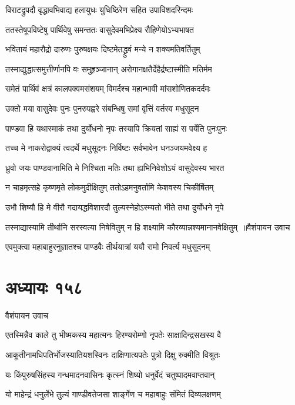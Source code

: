 \twolineshloka
{विराटद्रुपदौ वृद्धावभिवाद्य हलायुधः}
{युधिष्ठिरेण सहित उपाविशदरिन्दमः}


\twolineshloka
{ततस्तेषूपविष्टेषु पार्थिवेषु समन्ततः}
{वासुदेवमभिप्रेक्ष्य रौहिणेयोऽभ्यभाषत}


\twolineshloka
{भवितायं महारौद्रो दारुणः पुरुषक्षयः}
{दिष्टमेतद्ध्रुवं मन्ये न शक्यमतिवर्तितुम्}


\twolineshloka
{तस्माद्युद्धात्समुत्तीर्णानपि वः समुहृञ्जानान्}
{अरोगानक्षतैर्देहैर्द्रष्टास्मीति मतिर्मम}


\twolineshloka
{समेतं पार्थिवं क्षत्रं कालपक्वमसंशयम्}
{विमर्दश्च महान्भावी मांसशोणितकदर्दमः}


\twolineshloka
{उक्तो मया वासुदेवः पुनः पुनरुपह्वरे}
{संबन्धिषु समां वृत्तिं वर्तस्व मधुसूदन}


\twolineshloka
{पाण्डवा हि यथास्माकं तथा दुर्योधनो नृपः}
{तस्यापि क्रियतां साह्यं स पर्येति पुनःपुनः}


\twolineshloka
{तच्च मे नाकरोद्वाक्यं त्वदर्थे मधुसूदनः}
{निर्विष्टः सर्वभावेन धनञ्जयमवेक्ष्य ह}


\twolineshloka
{ध्रुवो जयः पाण्डवानामिति मे निश्चिता मतिः}
{तथा ह्यभिनिवेशोऽयं वासुदेवस्य भारत}


\twolineshloka
{न चाहमृत्सहे कृष्णमृते लोकमुदीक्षितुम्}
{ततोऽहमनुवर्तामि केशवस्य चिकीर्षितम्}


\twolineshloka
{उभौ शिष्यौ हि मे वीरौ गदायद्धविशारदौ}
{तुल्यस्नेहोऽस्म्यतो भीते तथा दुर्योधने नृपे}


\threelineshloka
{तस्माद्यास्यामि तीर्थानि सरस्वत्या निषेवितुम्}
{न हि शक्ष्यामि कौरव्यान्नश्यमानानवेक्षितुम् ॥वैशंपायन उवाच}
{}


\twolineshloka
{एवमुक्त्वा महाबाहुरनुज्ञातश्च पाण्डवैः}
{तीर्थयात्रां ययौ रामो निवर्त्य मधुसूदनम्}


\chapter{अध्यायः १५८}
\twolineshloka
{वैशंपायन उवाच}
{}


\twolineshloka
{एतस्मिन्नैव काले तु भीष्मकस्य महात्मनः}
{हिरण्यरोम्णो नृपतेः साक्षादिन्द्रसखस्य वै}


\twolineshloka
{आकूतीनामधिपतिर्भोजस्यातियशस्विनः}
{दाक्षिणात्यपतेः पुत्रो दिक्षु रुक्मीति विश्रुतः}


\twolineshloka
{यः किंपुरुषसिंहस्य गन्धमादनवासिनः}
{कृत्स्नं शिष्यो धनुर्वेदं चतुष्पादमवाप्तवान्}


\twolineshloka
{यो माहेन्द्रं धनुर्लेभे तुल्यं गाण्डीवतेजसा}
{शार्ङ्गेण च महाबाहुः संमितं दिव्यलक्षणम्}


